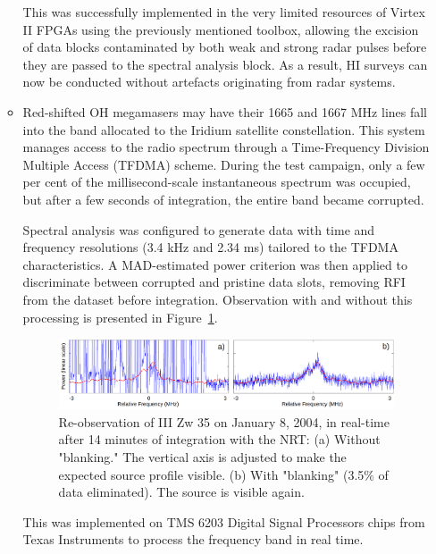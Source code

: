 \begin{itemize}
\begin{itemize}
This was successfully implemented in the very limited resources of Virtex II FPGAs using the previously mentioned toolbox, allowing the excision of data blocks contaminated by both weak and strong radar pulses before they are passed to the spectral analysis block. As a result, HI surveys can now be conducted without artefacts originating from radar systems.


\item Red-shifted OH megamasers may have their 1665 and 1667 MHz lines fall into the band allocated to the Iridium satellite constellation. This system manages access to the radio spectrum through a Time-Frequency Division Multiple Access (TFDMA) scheme. During the test campaign, only a few per cent of the millisecond-scale instantaneous spectrum was occupied, but after a few seconds of integration, the entire band became corrupted.

Spectral analysis was configured to generate data with time and frequency resolutions (3.4 kHz and 2.34 ms) tailored to the TFDMA characteristics. A MAD-estimated power criterion was then applied to discriminate between corrupted and pristine data slots, removing RFI from the dataset before integration. Observation with and without this processing is presented in Figure~\ref{fig:rfi_Iridium_blanked}.

\begin{figure}[ht]
    \centering
    \includegraphics[width=\textwidth]{figures/IIIZw35_20040108.png}
    \caption{Re-observation of III Zw 35 on January 8, 2004, in real-time after 14 minutes of integration with the NRT: (a) Without "blanking." The vertical axis is adjusted to make the expected source profile visible. (b) With "blanking" (3.5\% of data eliminated). The source is visible again.}
    \label{fig:rfi_Iridium_blanked}
\end{figure}

This was implemented on TMS 6203 Digital Signal Processors chips from Texas Instruments to process the frequency band in real time.
\end{itemize}


\end{itemize}
